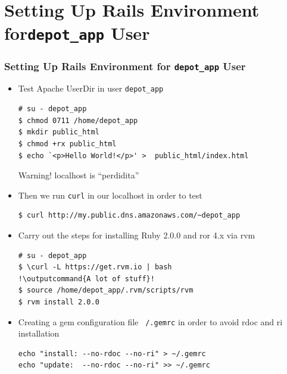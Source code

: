 \documentclass{beamer}
\newcommand{\outputcommand}[1]{\color{darkgreen}{#1}}
\begin{document}
\section{Setting Up Rails Environment for\texttt{depot\_app} User}
\begin{frame}
\frametitle{Setting Up Rails Environment for \texttt{depot\_app} User}
\begin{itemize}

\item Test Apache UserDir in user \texttt{depot\_app}
\lstset{language=shell, escapechar=!}
\begin{lstlisting}[escapechar=&]
# su - depot_app
$ chmod 0711 /home/depot_app
$ mkdir public_html
$ chmod +rx public_html
$ echo `<p>Hello World!</p>' >  public_html/index.html
\end{lstlisting}

\begin{block}{Warning!}
  localhost is ``perdidita''
\end{block}
\item Then we run \texttt{curl} in our \alert{localhost} in order to test 

\begin{lstlisting}[escapechar=&]
$ curl http://my.public.dns.amazonaws.com/~depot_app
\end{lstlisting}

\item Carry out the steps for installing Ruby 2.0.0 and \acrshort{ror} 4.x via \acrshort{rvm}

\lstset{language=shell, escapechar=!}
\begin{lstlisting}[escapechar=!]
# su - depot_app
$ \curl -L https://get.rvm.io | bash
!\outputcommand{A lot of stuff}!
$ source /home/depot_app/.rvm/scripts/rvm
$ rvm install 2.0.0
\end{lstlisting}

\item Creating a gem configuration file \texttt{~/.gemrc} in order to avoid rdoc and ri installation

\lstset{language=shell, escapechar=!}
\begin{lstlisting}[escapechar=!]
echo "install: --no-rdoc --no-ri" > ~/.gemrc
echo "update:  --no-rdoc --no-ri" >> ~/.gemrc
\end{lstlisting}
\end{itemize}
\end{frame}
\end{document}
